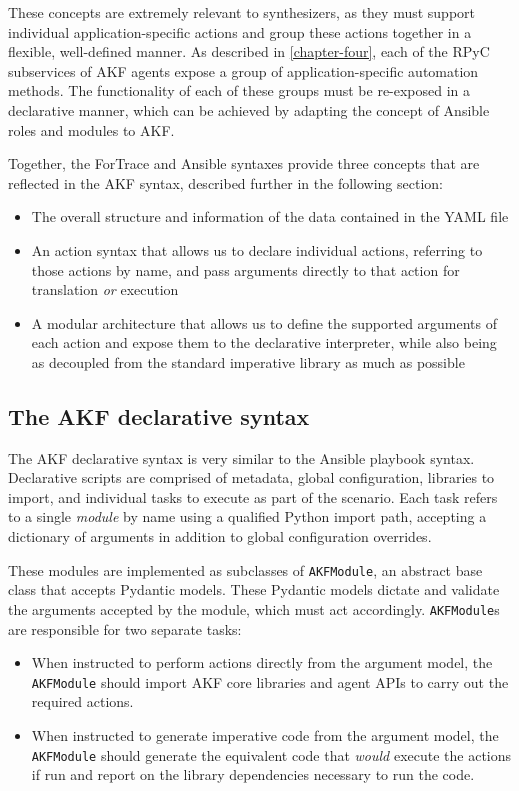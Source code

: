 These concepts are extremely relevant to synthesizers, as they must
support individual application-specific actions and group these actions
together in a flexible, well-defined manner. As described in
\autoref{chapter-four}, each of the RPyC subservices of AKF
agents expose a group of application-specific automation methods. The
functionality of each of these groups must be re-exposed in a
declarative manner, which can be achieved by adapting the concept of
Ansible roles and modules to AKF.

Together, the ForTrace and Ansible syntaxes provide three concepts that
are reflected in the AKF syntax, described further in the following
section:

\begin{itemize}
\tightlist
\item
  The overall structure and information of the data contained in the
  YAML file
\item
  An action syntax that allows us to declare individual actions,
  referring to those actions by name, and pass arguments directly to
  that action for translation \emph{or} execution
\item
  A modular architecture that allows us to define the supported
  arguments of each action and expose them to the declarative
  interpreter, while also being as decoupled from the standard
  imperative library as much as possible
\end{itemize}

\subsection{The AKF declarative
syntax}\label{the-akf-declarative-syntax}

The AKF declarative syntax is very similar to the Ansible playbook
syntax. Declarative scripts are comprised of metadata, global
configuration, libraries to import, and individual tasks to execute as
part of the scenario. Each task refers to a single \emph{module} by name
using a qualified Python import path, accepting a dictionary of
arguments in addition to global configuration overrides.

These modules are implemented as subclasses of
\passthrough{\lstinline!AKFModule!}, an abstract base class that accepts
Pydantic models. These Pydantic models dictate and validate the
arguments accepted by the module, which must act accordingly.
\passthrough{\lstinline!AKFModule!}s are responsible for two separate
tasks:

\begin{itemize}
\tightlist
\item
  When instructed to perform actions directly from the argument model,
  the \passthrough{\lstinline!AKFModule!} should import AKF core
  libraries and agent APIs to carry out the required actions.
\item
  When instructed to generate imperative code from the argument model,
  the \passthrough{\lstinline!AKFModule!} should generate the equivalent
  code that \emph{would} execute the actions if run and report on the
  library dependencies necessary to run the code.
\end{itemize}

